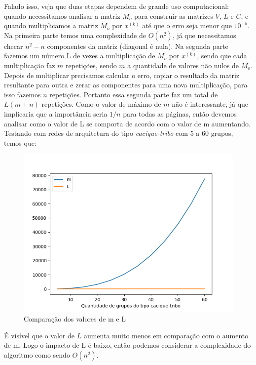 \documentclass[12pt]{article}
\begin{document}
			Falado isso, veja que duas etapas dependem de grande uso computacional: quando necessitamos analisar a matriz $M_o$ para construir as matrizes $V$, $L$ e $C$, e quando multiplicamos a matriz $M_o$ por $x^{(k)}$ até que o erro seja menor que $10^{-5}$. Na primeira parte temos uma complexidade de $O(n^2)$, já que necessitamos checar $n^2 - n$ componentes da matriz (diagonal é nula). Na segunda parte fazemos um número L de vezes a multiplicação de $M_o$ por $x^{(k)}$, sendo que cada multiplicação faz $m$ repetições, sendo $m$ a quantidade de valores não nulos de $M_o$. Depois de multiplicar precisamos calcular o erro, copiar o resultado da matriz resultante para outra e zerar as componentes para uma nova multiplicação, para isso fazemos $n$ repetições. Portanto essa segunda parte faz um total de $L(m + n)$ repetições. Como o valor de máximo de $m$ não é interessante, já que implicaria que a importância seria $1/n$ para todas as páginas, então devemos analisar como o valor de L se comporta de acordo com o valor de m aumentando. Testando com redes de arquitetura do tipo \emph{cacique-tribo} com 5 a 60 grupos, temos que:
			\begin{figure}[h]
  				\centering
  				\includegraphics[width=0.7\linewidth]{figure_m_L.png}
  				\caption{Comparação dos valores de m e L} \label{fig:M1}
			\end{figure}

			É visível que o valor de $L$ aumenta muito menos em comparação com o aumento de m. Logo o impacto de L é baixo, então podemos considerar a complexidade do algoritmo como sendo $O(n^2)$.
\end{document}
